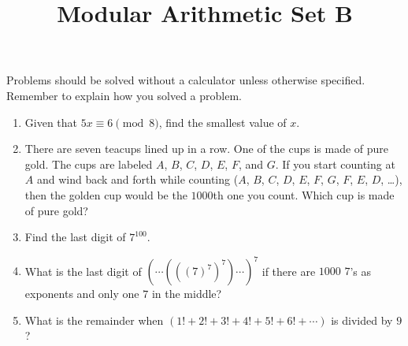 \documentclass{article}
\title{Modular Arithmetic Set B}
\date{}
\author{}
\begin{document}
\maketitle
\noindent Problems should be solved without a calculator unless otherwise specified.
Remember to explain how you solved a problem.
\begin{multicols}{2}
    \raggedcolumns
    \begin{enumerate}
        \item Given that $5x \equiv 6 \pmod 8$, find the smallest value of $x$.
            \vspace{3cm}
        \item There are seven teacups lined up in a row.
            One of the cups is made of pure gold.
            The cups are labeled $A$, $B$, $C$, $D$, $E$, $F$, and $G$.
            If you start counting at $A$ and wind back and forth while counting ($A$, $B$, $C$, $D$, $E$, $F$, $G$, $F$, $E$, $D$, \dots), then the golden cup would be the $1000$th one you count.
            Which cup is made of pure gold?
            \vspace{3cm}
        \item Find the last digit of $7^{100}$.
            \vspace{3cm}
        \item What is the last digit of $(\cdots(((7)^7)^7)\cdots)^7$ if there are $1000$ $7$'s as exponents and only one $7$ in the middle?
            \vspace{3cm}
        \item What is the remainder when $(1! + 2! + 3! + 4! + 5! + 6! + \cdots)$ is divided by $9$?
            \vspace{3cm}
    \end{enumerate}
\end{multicols}
\end{document}
